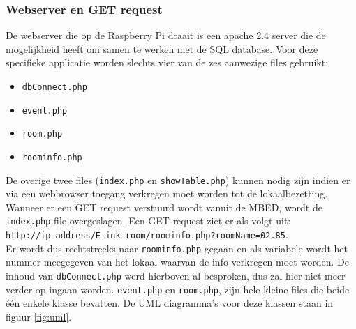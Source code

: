 \documentclass[a4paper,kul]{kulakarticle} %
\begin{document}
\subsubsection{Webserver en GET request}
De webserver die op de Raspberry Pi draait is een apache 2.4 server die de mogelijkheid heeft om samen te werken met de SQL database. Voor deze specifieke applicatie worden slechts vier van de zes aanwezige files gebruikt:
\begin{itemize}
	\item \verb|dbConnect.php|
	\item \verb|event.php|
	\item \verb|room.php|
	\item \verb|roominfo.php|
\end{itemize}
De overige twee files (\verb|index.php| en \verb|showTable.php|) kunnen nodig zijn indien er via een webbrowser toegang verkregen moet worden tot de lokaalbezetting. Wanneer er een  GET request verstuurd wordt vanuit de MBED, wordt de \verb|index.php| file overgeslagen. Een GET request ziet er als volgt uit: \\ \verb|http://ip-address/E-ink-room/roominfo.php?roomName=02.85|. \\ Er wordt dus rechtstreeks naar \verb|roominfo.php| gegaan en als variabele wordt het nummer meegegeven van het lokaal waarvan de info verkregen moet worden.  De inhoud van \verb|dbConnect.php| werd hierboven al besproken, dus zal hier niet meer verder op ingaan worden. \verb|event.php| en \verb|room.php|, zijn hele kleine files die beide \'{e}\'{e}n enkele klasse bevatten. De UML diagramma's voor deze klassen staan in figuur \ref{fig:uml}.
\end{document}
